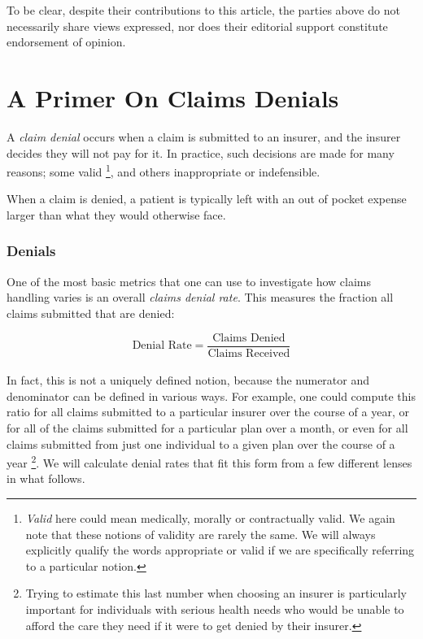 \documentclass[12pt, a4paper,twoside,parskip=full]{report}
\theoremstyle{plain} %
\theoremstyle{definition} %
\theoremstyle{remark} %
\numberwithin{equation}{chapter}
\begin{document}
		\noindent To be clear, despite their contributions to this article, the parties above do not necessarily share
		views expressed, nor does their editorial support constitute endorsement of opinion.
		
	
		
		\chapter{A Primer On Claims Denials}\label{primer}
		
		A \emph{claim denial} occurs when a claim is submitted to an insurer, and the insurer decides they will not pay for it. In practice, such decisions are made for many reasons; some valid \footnote{\emph{Valid} here could mean medically, morally or contractually valid. We again note that these notions of validity are rarely the same. We will always explicitly qualify the words appropriate or valid if we are specifically referring to a particular notion.}, and others inappropriate or indefensible.
		
		When a claim is denied, a patient is typically left with an out of pocket expense larger than what they would otherwise face.

		\subsection{Denials}
		
		One of the most basic metrics that one can use to investigate how claims handling varies is an overall \emph{claims denial rate}. This measures the fraction all claims submitted that are denied:
		
		\begin{equation*}
			\text{Denial Rate} = \dfrac{\text{Claims Denied}}{\text{Claims Received}}
		\end{equation*}
		\hfill\\
		In fact, this is not a uniquely defined notion, because the numerator and denominator can be defined in various ways. For example, one could compute this ratio for all claims submitted to a particular insurer over the course of a year, or for all of the claims submitted for a particular plan over a month, or even for all claims submitted from just one individual to a given plan over the course of a year \footnote{Trying to estimate this last number when choosing an insurer is particularly important for individuals with serious health needs who would be unable to afford the care they need if it were to get denied by their insurer.}. We will calculate denial rates that fit this form from a few different lenses in what follows.
		
\end{document}
